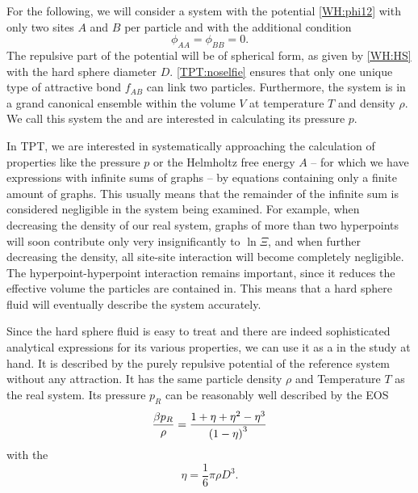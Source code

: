 \documentclass[8.5pt,twoside,twocolumn]{article}
\theoremstyle{standard}
\begin{document}
For the following, we will consider a system with the potential \eqref{WH:phi12}
with only two sites $A$ and $B$ per particle and with the additional condition
\newcommand{\tr}{\rho}
\renewcommand{\e}{\eta}
\begin{equation}
\phi_{AA}=\phi_{BB}=0.
\label{TPT:noselfie}
\end{equation} 
The repulsive part of the potential will be of spherical form, as given by \eqref{WH:HS}
with the hard sphere diameter $D$. \eqref{TPT:noselfie} ensures that only one unique type
of attractive bond $f_{AB}$ can link two particles. Furthermore, the system is in a
grand canonical ensemble within the volume $V$ at temperature $T$ and density $\rho$.
We call this system the  and are interested in calculating its pressure $p$. 

In TPT, we are interested in systematically approaching the calculation of properties like
the pressure $p$ or the Helmholtz free energy $A$ -- for which we have expressions
with infinite sums of graphs -- by equations containing only a finite amount of graphs.
This usually means that the remainder of the infinite sum is considered negligible in the
system being examined. For example, when decreasing the density of our real system, graphs of
more than two hyperpoints will soon contribute only very insignificantly to $\ln\Xi$, and when further
decreasing the density, all site-site interaction will become completely negligible.
The hyperpoint-hyperpoint interaction remains important, since it reduces the
effective volume the particles are contained in. This means that a hard sphere fluid will
eventually describe the system accurately.

Since the hard sphere fluid is easy to treat and there are indeed sophisticated analytical
expressions for its various properties, we can use it as a  in the
study at hand. It is described by the purely repulsive potential of the reference system
without any attraction. It has the same particle density $\rho$ and Temperature $T$ as the
real system. Its pressure $p_R$ can be reasonably well described by the 
EOS\cite{CarnahanStarling}
\begin{equation}
\frac{\be p_R}{\tr}=\frac{1+\e+\e^2-\e^3}{\rb{1-\e}^3}
\end{equation}
with the 
\begin{equation}
\e=\frac 1 6 \pi\tr D^3.
\end{equation}
\end{document}
